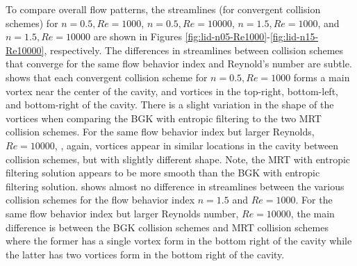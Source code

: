 To compare overall flow patterns, the streamlines (for convergent collision schemes) for $n = 0.5, Re = 1000$, $n = 0.5, Re = 10000$, $n = 1.5, Re = 1000$, and $n = 1.5, Re = 10000$ are shown in Figures \ref{fig:lid-n05-Re1000}-\ref{fig:lid-n15-Re10000}, respectively.
The differences in streamlines between collision schemes that converge for the same flow behavior index and Reynold's number are subtle.
 shows that each convergent collision scheme for $n = 0.5, Re = 1000$ forms a main vortex near the center of the cavity, and vortices in the top-right, bottom-left, and bottom-right of the cavity.
There is a slight variation in the shape of the vortices when comparing the BGK with entropic filtering to the two MRT collision schemes.
For the same flow behavior index but larger Reynolds, $Re = 10000$, , again, vortices appear in similar locations in the cavity between collision schemes, but with slightly different shape.
Note, the MRT with entropic filtering solution appears to be more smooth than the BGK with entropic filtering solution.
 shows almost no difference in streamlines between the various collision schemes for the flow behavior index $n = 1.5$ and $Re = 1000$.
For the same flow behavior index but larger Reynolds number, $Re = 10000$,  the main difference is between the BGK collision schemes and MRT collision schemes where the former has a single vortex form in the bottom right of the cavity while the latter has two vortices form in the bottom right of the cavity.

